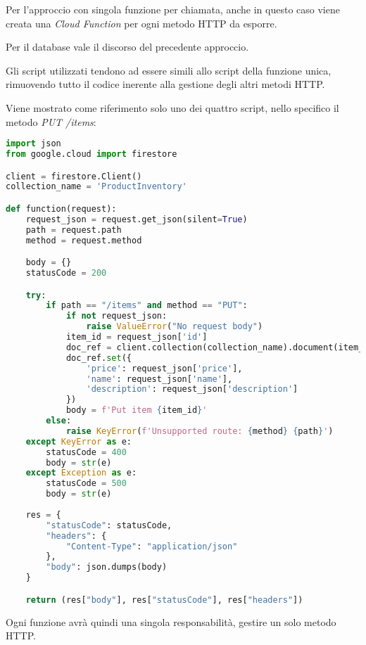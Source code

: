 Per l'approccio con singola funzione per chiamata, anche in questo caso viene creata una \textit{Cloud Function} per ogni metodo HTTP da esporre.

Per il database vale il discorso del precedente approccio.

Gli script utilizzati tendono ad essere simili allo script della funzione unica, rimuovendo tutto il codice inerente alla gestione degli altri metodi HTTP.

Viene mostrato come riferimento solo uno dei quattro script, nello specifico il metodo \textit{PUT /items}:
\begin{lstlisting}[language=python]
import json
from google.cloud import firestore

client = firestore.Client()
collection_name = 'ProductInventory'

def function(request):
    request_json = request.get_json(silent=True)
    path = request.path
    method = request.method

    body = {}
    statusCode = 200

    try:
        if path == "/items" and method == "PUT":
            if not request_json:
                raise ValueError("No request body")
            item_id = request_json['id']
            doc_ref = client.collection(collection_name).document(item_id)
            doc_ref.set({
                'price': request_json['price'],
                'name': request_json['name'],
                'description': request_json['description']
            })
            body = f'Put item {item_id}'
        else:
            raise KeyError(f'Unsupported route: {method} {path}')
    except KeyError as e:
        statusCode = 400
        body = str(e)
    except Exception as e:
        statusCode = 500
        body = str(e)
    
    res = {
        "statusCode": statusCode,
        "headers": {
            "Content-Type": "application/json"
        },
        "body": json.dumps(body)
    }

    return (res["body"], res["statusCode"], res["headers"])
\end{lstlisting}
Ogni funzione avrà quindi una singola responsabilità, gestire un solo metodo HTTP.